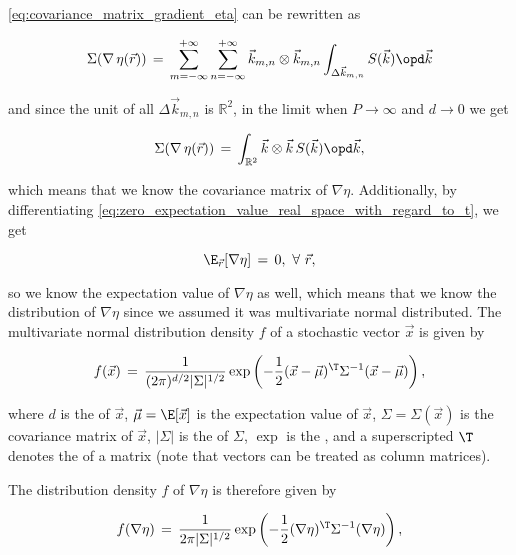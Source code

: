 {\eqref{eq:covariance_matrix_gradient_eta} can be rewritten as

\begin{equation}
\Sigma(\nabla\,\eta(\vec{r})) \,=\, \sum_{m=-\infty}^{+\infty}\sum_{n=-\infty}^{+\infty}\vec{k}_{m,n}\otimes\vec{k}_{m,n} \int_{\Delta\vec{k}_{m,n}}S(\vec{k})\opd\vec{k}
\end{equation}

and since the unit of all $\Delta\vec{k}_{m,n}$ is $\mathbb{R}^2$, in the limit when $P\to\infty$ and $d\to 0$ we get

\begin{equation} \label{eq:covariance_matrix_gradient_eta_final}
\Sigma(\nabla\,\eta(\vec{r})) \,=\, \int_{\mathbb{R}^2}\vec{k}\otimes\vec{k}\,S(\vec{k})\opd\vec{k},
\end{equation}

which means that we know the covariance matrix of $\nabla\eta$. Additionally, by differentiating \eqref{eq:zero_expectation_value_real_space_with_regard_to_t}, we get

\begin{equation}
\E_{\vec{r}}[\nabla\eta] \,=\, 0,\ \forall\ \vec{r},
\end{equation}

so we know the expectation value of $\nabla\eta$ as well, which means that we know the distribution of $\nabla\eta$ since we assumed it was multivariate normal distributed. The multivariate normal distribution density $f$ of a stochastic vector $\vec{x}$ is given by

\begin{equation} \label{eq:multivariate_normal_distribution_density}
f(\vec{x}) \,=\, \frac{1}{(2\pi)^{d/2}|\Sigma|^{1/2}}\exp\left(-\frac{1}{2}(\vec{x}-\vec{\mu})^{\T}\Sigma^{-1}(\vec{x}-\vec{\mu})\right),
\end{equation}

where $d$ is the \dimensionality of $\vec{x}$, $\vec{\mu} = \E[\vec{x}]$ is the expectation value of $\vec{x}$, $\Sigma = \Sigma(\vec{x})$ is the covariance matrix of $\vec{x}$, $|\Sigma|$ is the \determinant of $\Sigma$, $\exp$ is the , and a superscripted $\T$ denotes the \transpose of a matrix (note that vectors can be treated as column matrices).

The distribution density $f$ of $\nabla\eta$ is therefore given by

\begin{equation} \label{eq:eta_grad_distribution}
f(\nabla\eta) \,=\, \frac{1}{2\pi|\Sigma|^{1/2}}\exp\left(-\frac{1}{2}(\nabla\eta)^{\T}\Sigma^{-1}(\nabla\eta)\right),
\end{equation}

}
